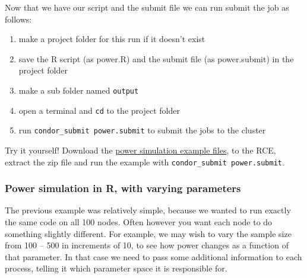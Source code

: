 \documentclass[11pt]{article}
\begin{document}
Now that we have our script and the submit file we can run submit the job as follows:
\begin{enumerate}
\item make a project folder for this run if it doesn't exist
\item save the R script (as power.R) and the submit file (as power.submit) in the project folder
\item make a sub folder named \texttt{output}
\item open a terminal and \texttt{cd} to the project folder
\item run \texttt{condor\_submit power.submit} to submit the jobs to the cluster
\end{enumerate}

Try it yourself! Download the \href{examples/power.zip}{power simulation example files}, to the RCE, extract the zip file and run the example with \texttt{condor\_submit power.submit}. 

\subsubsection{Power simulation in R, with varying parameters}
\label{sec-7-3-2}
The previous example was relatively simple, because we wanted to run exactly the same code on all 100 nodes. Often however you want each node to do something slightly different. For example, we may wish to vary the sample size from 100 -- 500 in increments of 10, to see how power changes as a function of that parameter. In that case we need to pass some additional information to each process, telling it which parameter space it is responsible for. 
\end{document}
